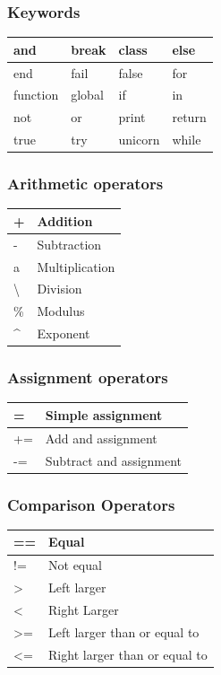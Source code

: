 \documentclass[a4paper,11pt]{article}
\begin{document}
\begin{multicols}{2}

\subsubsection*{Keywords}
\begin{tabular}{| l | l | l | l | } \hline
and & break & class & else \\ \hline
end & fail & false & for \\ \hline
function & global & if & in \\ \hline
not & or & print & return \\ \hline
true & try & unicorn & while \\ \hline
\end{tabular}

\subsubsection*{Arithmetic operators}
\begin{tabular}{| l | l | } \hline
+ & Addition \\ \hline
- & Subtraction \\ \hline
a & Multiplication \\ \hline
\textbackslash & Division \\ \hline
\% & Modulus \\ \hline
\textasciicircum  & Exponent \\ \hline
\end{tabular}

\subsubsection*{Assignment operators}
\begin{tabular}{| l | l | } \hline
= & Simple assignment  \\ \hline
+= & Add and assignment  \\ \hline
-= & Subtract and assignment  \\ \hline
\end{tabular}

\subsubsection*{Comparison Operators}
\begin{tabular}{| l | l | } \hline
== & Equal \\ \hline
!= & Not equal \\ \hline
\textgreater & Left larger \\ \hline
\textless & Right Larger \\ \hline
\textgreater= & Left larger than or equal to \\ \hline
\textless= & Right larger than or equal to \\ \hline
\end{tabular}

\end{multicols}
\end{document}
